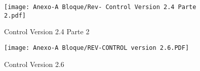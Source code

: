     \begin{landscape}
        \begin{sidewaysfigure}
            \centering
            \texttt{[image: Anexo-A Bloque/Rev- Control Version 2.4 Parte 2.pdf]}
            \caption{Control Version 2.4 Parte 2}
            \label{fig:A_1}
        \end{sidewaysfigure}
        
        \newpage
        
        \begin{sidewaysfigure}
            \centering
            \texttt{[image: Anexo-A Bloque/REV-CONTROL version 2.6.PDF]}
            \caption{Control Version 2.6}
            \label{fig:A_2}
        \end{sidewaysfigure}
        
    \end{landscape}